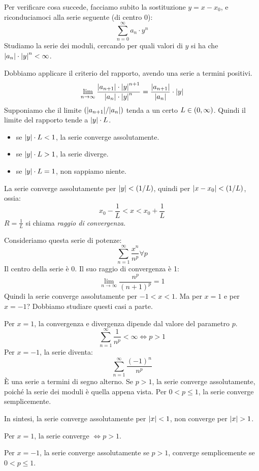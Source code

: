 Per verificare cosa succede, facciamo subito la sostituzione $y = x - x_0$, e riconduciamoci alla serie seguente (di centro 0):
\[
\sum_{n = 0}^{\infty} a_n \cdot y^n
\]
Studiamo la serie dei moduli, cercando per quali valori di $y$ si ha che $\left\lvert{a_n}\right\rvert \cdot \left\lvert{y}\right\rvert^n < \infty$.

Dobbiamo applicare il criterio del rapporto, avendo una serie a termini positivi.
\[
\lim_{n \to \infty} \frac{\abs{a_{n+1}} \cdot \abs{y}^{n+1}}{\abs{a_n} \cdot \abs{y}^n} = \frac{\abs{a_{n+1}}}{\abs{a_n}} \cdot \abs{y}
\]
Supponiamo che il limite $\frac{\abs{a_{n+1}}}{\abs{a_n}}$ tenda a un certo $L \in \left( {0}, {\infty} \right)$. Quindi il limite del rapporto tende a $\left\lvert{y}\right\rvert \cdot L$.
\begin{itemize}
    \item se $\left\lvert{y}\right\rvert \cdot L < 1$, la serie converge assolutamente.
    \item se $\left\lvert{y}\right\rvert \cdot L > 1$, la serie diverge.
    \item se $\left\lvert{y}\right\rvert \cdot L = 1$, non sappiamo niente.
\end{itemize}

La serie converge assolutamente per $\abs{y} < \frac{1}{L}$, quindi per $\abs{x - x_0} < \frac{1}{L}$, ossia:
\[
x_0 - \frac{1}{L} < x < x_0 + \frac{1}{L}
\]
$R = \frac{1}{L}$ si chiama \emph{raggio di convergenza}.

\begin{exmp}
Consideriamo questa serie di potenze:
\[
\sum_{n = 1}^{\infty} \frac{x^n}{n^p} \forall p
\]
Il centro della serie \`e 0. Il suo raggio di convergenza \`e 1:
\[
\lim_{n \to \infty} \frac{n^p}{(n+1)^p} = 1
\]
Quindi la serie converge assolutamente per $-1 < x < 1$. Ma per $x = 1$ e per $x = -1$? Dobbiamo studiare questi casi a parte.

Per $x = 1$, la convergenza e divergenza dipende dal valore del parametro $p$.
\[
\sum_{n = 1}^{\infty} \frac{1}{n^p} < \infty \iff p > 1
\]
Per $x = -1$, la serie diventa:
\[
\sum_{n = 1}^{\infty} \frac{(-1)^n}{n^p}
\]
\`E una serie a termini di segno alterno. Se $p > 1$, la serie converge assolutamente, poich\'e la serie dei moduli \`e quella appena vista. Per $0 < p \le 1$, la serie converge semplicemente.

In sintesi, la serie converge assolutamente per $\left\lvert{x}\right\rvert < 1$, non converge per $\left\lvert{x}\right\rvert > 1$.

Per $x = 1$, la serie converge $\iff p > 1$.

Per $x = -1$, la serie converge assolutamente se $p > 1$, converge semplicemente se $0 < p \le 1$.
\end{exmp}

